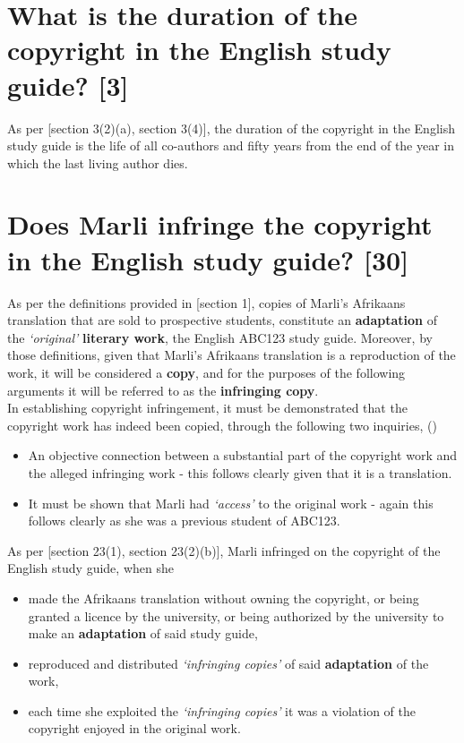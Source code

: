 \documentclass[11pt]{article}
\begin{document}
\section{What is the duration of the copyright in the English study guide? \textbf{[3]}}
\label{sec:orgc64a2f3}

As per [section 3(2)(a), section 3(4)]\cite{rsa78_copyrightact}, the
duration of the copyright in the English study guide is the life of
all co-authors and fifty years from the end of the year in which the
last living author dies.

\section{Does Marli infringe the copyright in the English study guide? \textbf{[30]}}
\label{sec:org56d738a}
As per the definitions provided in [section 1]\cite{rsa78_copyrightact},
copies of Marli's Afrikaans translation that are sold to prospective
students, constitute an \textbf{adaptation} of the \emph{`original'} \textbf{literary
work}, the English ABC123 study guide. Moreover, by those definitions,
given that Marli's Afrikaans translation is a reproduction of the
work, it will be considered a \textbf{copy}, and for the purposes of the
following arguments it will be referred to as the \textbf{infringing copy}.\\

In establishing copyright infringement, it must be demonstrated that the copyright work has indeed been copied, through
the following two inquiries, ()\cite{corbett89_galago_v_erasmus}
\begin{itemize}
\item An objective connection between a substantial part of the copyright work and the alleged infringing work - this follows clearly given that it is a translation.
\item It must be shown that Marli had \emph{`access'} to the original work - again this follows clearly as she was a previous student of ABC123.
\end{itemize}

As per [section 23(1), section 23(2)(b)]\cite{rsa78_copyrightact}, Marli
infringed on the copyright of the English study guide, when she
\begin{itemize}
\item made the Afrikaans translation without owning the copyright, or
being granted a licence by the university, or being authorized by
the university to make an \textbf{adaptation} of said study guide,
\item reproduced and distributed \emph{`infringing copies'} of said \textbf{adaptation} of
the work,
\item each time she exploited the \emph{`infringing copies'} it was a violation
of the copyright enjoyed in the original work.
\end{itemize}
\end{document}
